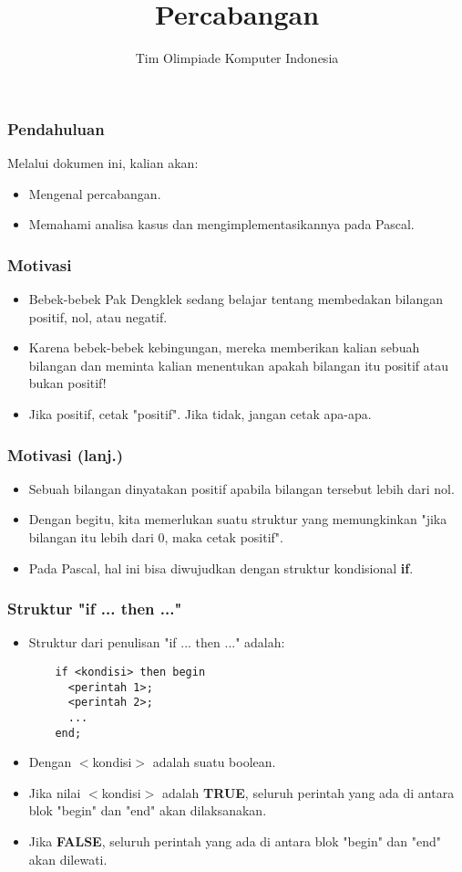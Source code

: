

\title{Percabangan}
\author{Tim Olimpiade Komputer Indonesia}
\date{}



\begin{frame}
\titlepage
\end{frame}

\begin{frame}
\frametitle{Pendahuluan}
Melalui dokumen ini, kalian akan:
\begin{itemize}
  \item Mengenal percabangan.
  \item Memahami analisa kasus dan mengimplementasikannya pada Pascal.
\end{itemize}
\end{frame}

\begin{frame}
\frametitle{Motivasi}
\begin{itemize}
  \item Bebek-bebek Pak Dengklek sedang belajar tentang membedakan bilangan positif, nol, atau negatif.
  \item Karena bebek-bebek kebingungan, mereka memberikan kalian sebuah bilangan dan meminta kalian menentukan apakah bilangan itu positif atau bukan positif!
  \item Jika positif, cetak "positif". Jika tidak, jangan cetak apa-apa.
\end{itemize}
\end{frame}

\begin{frame}
\frametitle{Motivasi (lanj.)}
\begin{itemize}
  \item Sebuah bilangan dinyatakan positif apabila bilangan tersebut lebih dari nol.
  \item Dengan begitu, kita memerlukan suatu struktur yang memungkinkan "\alert{jika} bilangan itu lebih dari 0, \alert{maka} cetak positif".
  \item Pada Pascal, hal ini bisa diwujudkan dengan struktur kondisional \alert{\textbf{if}}.
\end{itemize}
\end{frame}

\begin{frame}[fragile]
\frametitle{Struktur "if ... then ..."}
\begin{itemize}
  \item Struktur dari penulisan "if ... then ..." adalah:
  \begin{lstlisting}
    if <kondisi> then begin
      <perintah 1>;
      <perintah 2>;
      ...
    end;
  \end{lstlisting}

  \item Dengan $<$kondisi$>$ adalah suatu boolean.
  \item Jika nilai $<$kondisi$>$ adalah \textbf{TRUE}, seluruh perintah yang ada di antara blok "begin" dan "end" akan dilaksanakan.
  \item Jika \textbf{FALSE}, seluruh perintah yang ada di antara blok "begin" dan "end" akan dilewati.
\end{itemize}
\end{frame}

